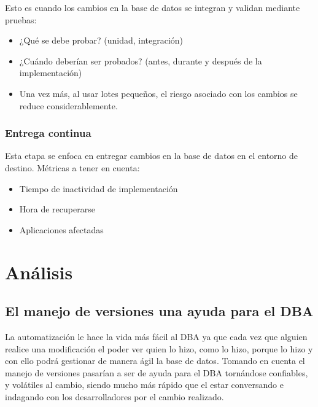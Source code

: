 \documentclass[preprint,12pt]{elsarticle}
\begin{document}
Esto es cuando los cambios en la base de datos se integran y validan mediante pruebas:
\begin{itemize}
\item ¿Qué se debe probar? (unidad, integración)
\item ¿Cuándo deberían ser probados? (antes, durante y después de la implementación)
\item Una vez más, al usar lotes pequeños, el riesgo asociado con los cambios se reduce considerablemente.
\end{itemize}


\subsubsection{\textbf{Entrega continua}}

Esta etapa se enfoca en entregar cambios en la base de datos en el entorno de destino. Métricas a tener en cuenta:
\begin{itemize}
\item Tiempo de inactividad de implementación
\item Hora de recuperarse
\item Aplicaciones afectadas
\end{itemize}



\section{Análisis}

\subsection{\textbf{El manejo de versiones una ayuda para el DBA}}
La automatización le hace la vida más fácil al DBA ya que cada vez que alguien realice una modificación el poder ver quien lo hizo, como lo hizo, porque lo hizo y con ello podrá gestionar de manera ágil la base de datos. Tomando en cuenta el manejo de versiones pasarían a ser de ayuda para el DBA tornándose confiables, y volátiles al cambio, siendo mucho más rápido que el estar conversando e indagando con los desarrolladores por el cambio realizado.

\end{document}
